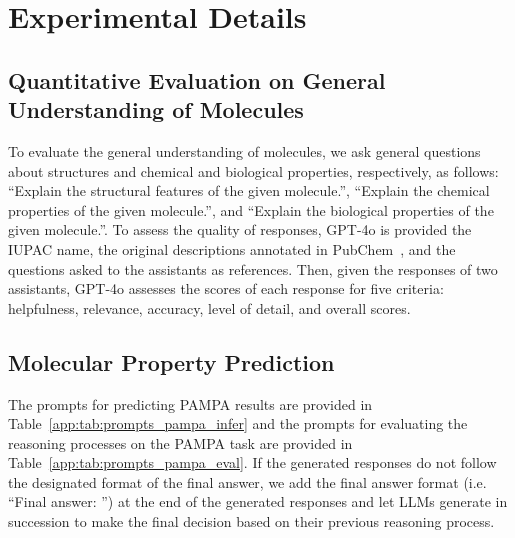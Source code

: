 \clearpage



\clearpage


\clearpage


\clearpage




\clearpage


\section{Experimental Details\label{app:sec:experimental_details}}
\subsection{Quantitative Evaluation on General Understanding of Molecules\label{app:sec:details_quantitative_evaluation}}
To evaluate the general understanding of molecules, we ask general questions about structures and chemical and biological properties, respectively, as follows: ``Explain the structural features of the given molecule.'', ``Explain the chemical properties of the given molecule.'', and ``Explain the biological properties of the given molecule.''. To assess the quality of responses, GPT-4o is provided the IUPAC name, the original descriptions annotated in PubChem~\cite{kim2021pubchem}, and the questions asked to the assistants as references. Then, given the responses of two assistants, GPT-4o assesses the scores of each response for five criteria: helpfulness, relevance, accuracy, level of detail, and overall scores.

\subsection{Molecular Property Prediction\label{app:sec:details_molecular_property_prediction}}
The prompts for predicting PAMPA results are provided in Table~\ref{app:tab:prompts_pampa_infer} and the prompts for evaluating the reasoning processes on the PAMPA task are provided in Table~\ref{app:tab:prompts_pampa_eval}. If the generated responses do not follow the designated format of the final answer, we add the final answer format (i.e. ``Final answer: '') at the end of the generated responses and let LLMs generate in succession to make the final decision based on their previous reasoning process.


